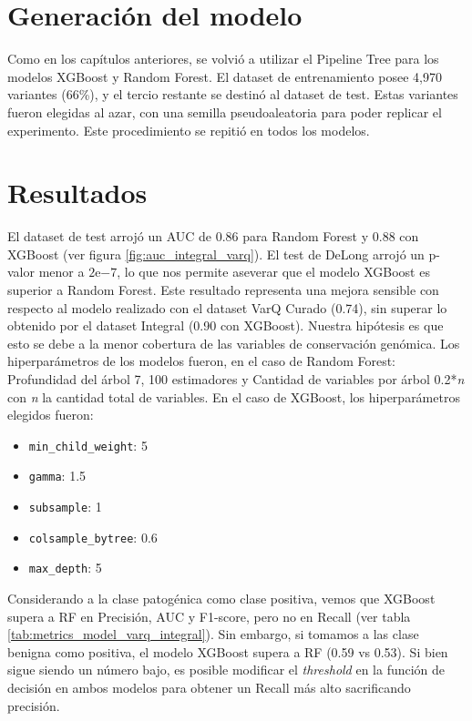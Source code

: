 \section{Generación del modelo}
Como en los capítulos anteriores, se volvió a utilizar el Pipeline Tree para los modelos XGBoost y Random Forest. El dataset de entrenamiento posee 4,970 variantes (66\%), y el tercio restante se destinó al dataset de test. Estas variantes fueron elegidas al azar, con una semilla pseudoaleatoria para poder replicar el experimento. Este procedimiento se repitió en todos los modelos.  

\section{Resultados}
El dataset de test arrojó un AUC de 0.86 para Random Forest y 0.88 con XGBoost (ver figura \ref{fig:auc_integral_varq}). El test de DeLong \cite{DeLong} arrojó un p-valor menor a $2\mathrm{e}{-7}$, lo que nos permite aseverar que el modelo XGBoost es superior a Random Forest. Este resultado representa una mejora sensible con respecto al modelo realizado con el dataset VarQ Curado (0.74), sin superar lo obtenido por el dataset Integral (0.90 con XGBoost). Nuestra hipótesis es que esto se debe a la menor cobertura de las variables de conservación genómica. Los hiperparámetros de los modelos fueron, en el caso de Random Forest: Profundidad del árbol 7, 100 estimadores y Cantidad de variables por árbol 0.2*\textit{n} con \textit{n} la cantidad total de variables. En el caso de XGBoost, los hiperparámetros elegidos fueron:

\begin{itemize}
    \item \texttt{min\_child\_weight}: 5
    \item \texttt{gamma}: 1.5
    \item \texttt{subsample}: 1
    \item \texttt{colsample\_bytree}: 0.6
    \item \texttt{max\_depth}: 5
\end{itemize}

Considerando a la clase patogénica como clase positiva, vemos que XGBoost supera a RF en Precisión, AUC y F1-score, pero no en Recall (ver tabla \ref{tab:metrics_model_varq_integral}). Sin embargo, si tomamos a las clase benigna como positiva, el modelo XGBoost supera a RF (0.59 vs 0.53). Si bien sigue siendo un número bajo, es posible modificar el \textit{threshold} en la función de decisión en ambos modelos para obtener un Recall más alto sacrificando precisión. 

